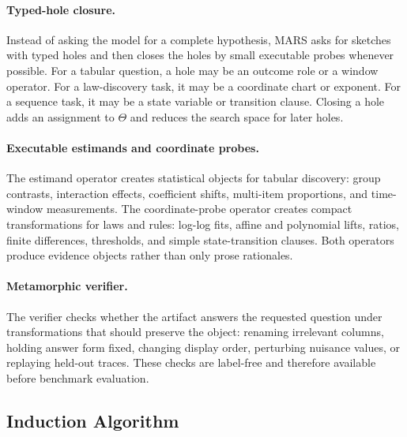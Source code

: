 \documentclass[letterpaper]{article}
\newcommand{\mars}{\textsc{MARS}\xspace}
\begin{document}
\paragraph{Typed-hole closure.}
Instead of asking the model for a complete hypothesis, \mars asks for sketches
with typed holes and then closes the holes by small executable probes whenever
possible. For a tabular question, a hole may be an outcome role or a window
operator. For a law-discovery task, it may be a coordinate chart or exponent.
For a sequence task, it may be a state variable or transition clause. Closing a
hole adds an assignment to $\Theta$ and reduces the search space for later
holes.

\paragraph{Executable estimands and coordinate probes.}
The estimand operator creates statistical objects for tabular discovery:
group contrasts, interaction effects, coefficient shifts, multi-item
proportions, and time-window measurements. The coordinate-probe operator
creates compact transformations for laws and rules: log-log fits, affine and
polynomial lifts, ratios, finite differences, thresholds, and simple
state-transition clauses. Both operators produce evidence objects rather than
only prose rationales.

\paragraph{Metamorphic verifier.}
The verifier checks whether the artifact answers the requested question under
transformations that should preserve the object: renaming irrelevant columns,
holding answer form fixed, changing display order, perturbing nuisance values,
or replaying held-out traces. These checks are label-free and therefore
available before benchmark evaluation.

\subsection{Induction Algorithm}
\end{document}
